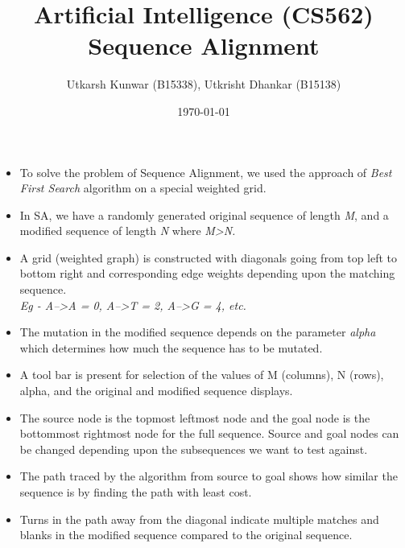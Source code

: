 \documentclass[a4paper, 12pt]{article}
\title{\Large{\textbf{Artificial Intelligence (CS562)}}\\\vspace{0.5em}Sequence Alignment\\
}
\author{\normalsize{Utkarsh Kunwar (B15338), Utkrisht Dhankar (B15138)}}
\date{\normalsize{\today}}
\begin{document}
\maketitle

\normalsize

\begin{itemize}
	\item To solve the problem of Sequence Alignment, we used the approach of \textit{Best First Search} algorithm on a special weighted grid.
	\item In SA, we have a randomly generated original sequence of length \textit{M}, and a modified sequence of length \textit{N} where \textit{M\textgreater N.}
	\item A grid (weighted graph) is constructed with diagonals going from top left to bottom right and corresponding edge weights depending upon the matching sequence. \\ \textit{Eg - A--\textgreater A = 0, A--\textgreater T = 2, A--\textgreater G = 4, etc.}
	\item The mutation in the modified sequence depends on the parameter \textit{alpha} which determines how much the sequence has to be mutated.
	\item A tool bar is present for selection of the values of M (columns), N (rows), alpha, and the original and modified sequence displays.
	\item The source node is the topmost leftmost node and the goal node is the bottommost rightmost node for the full sequence. Source and goal nodes can be changed depending upon the subsequences we want to test against.
	\item The path traced by the algorithm from source to goal shows how similar the sequence is by finding the path with least cost.
	\item Turns in the path away from the diagonal indicate multiple matches and blanks in the modified sequence compared to the original sequence.
	
\end{itemize}
\end{document}
